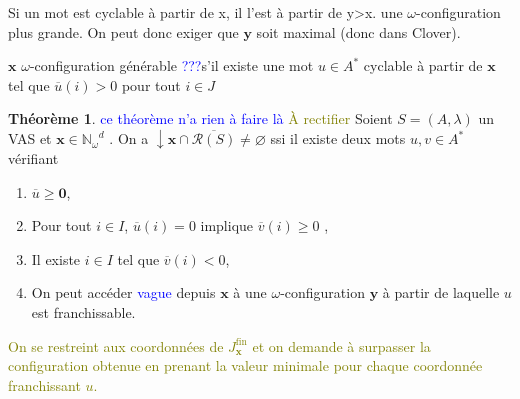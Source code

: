 \documentclass[a4paper,final]{article}
\theoremstyle{definition}
\newtheorem{Theorem}{Théorème}
\let\geq\geqslant
\newcommand{\alain}[1]{\textcolor{blue}{#1}}
\newcommand{\lucas}[1]{\textcolor{olive}{#1}}
\newcommand{\eqfin}{\ensuremath{=_\text{fin}}}
\let\inter\cap
\let\vide\varnothing
\newcommand{\N}{\ensuremath{\mathbb{N}}}
\newcommand{\Nomega}{\ensuremath{\mathbb{N}_\omega}}
\newcommand{\trans}[2]{\ensuremath{\stackrel{#1}{\longrightarrow}_{#2}}}
\newcommand{\vect}[1]{\ensuremath{\mathbf{#1}}}
\newcommand{\valeur}[1]{\ensuremath{\overline{#1}}}
\newcommand{\inirat}{\mathcal{R}}
\newcommand{\Jfin}[1]{J^\text{fin}_{#1}}
\newcommand{\Jinf}[1]{J^\text{inf}_{#1}}
\begin{document}
Si un mot est cyclable à partir de x, il l'est à partir de y>x.   une $\omega$-configuration plus grande.
On peut donc exiger que $\vect{y}$ soit maximal (donc dans Clover).

$\vect{x}$ $\omega$-configuration générable \alain{???}s'il existe une mot $u\in A^*$ cyclable à partir de $\vect{x}$ tel que $\valeur{u}(i) > 0$ pour tout $i\in J$ %


\begin{Theorem}\alain{ce théorème n'a rien à faire là}
\lucas{À rectifier}
Soient $S = (A,\lambda)$ un VAS et $\vect{x}\in\Nomega^d$ .
On a $\downarrow \vect{x} \inter \overline{\inirat(S)} \neq \vide$ ssi
il existe deux mots $u,v \in A^*$ vérifiant
\begin{enumerate}
    \item $\valeur{u} \geq \vect{0}$,
    \item Pour tout $i \in I$, $\valeur{u}(i)=0$ implique $\valeur{v}(i) \geq 0$ ,
    \item Il existe $i\in I$ tel que $\valeur{v}(i) < 0$,
    \item On peut accéder \alain{vague} depuis $\vect{x}$ à une $\omega$-configuration $\vect{y}$ à partir de laquelle $u$ est franchissable.
\end{enumerate}

\lucas{On se restreint aux coordonnées de $\Jfin{\vect{x}}$ et on demande à surpasser la configuration obtenue en prenant la valeur minimale pour chaque coordonnée franchissant $u$.}
\end{Theorem}
\end{document}
